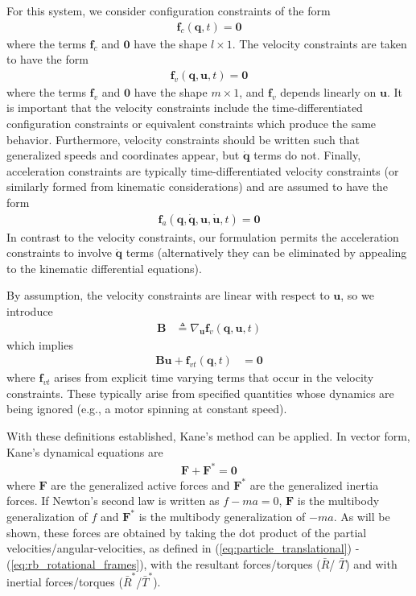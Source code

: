 \documentclass[smallcondensed,final]{svjour3}                     %
\begin{document}
For this system, we consider configuration constraints of the form
\begin{align}
\label{eq:configuration_constraints}
\mathbf{f}_c(\mathbf{q}, t) = \mathbf{0}
\end{align}
where the terms $\mathbf{f}_c$ and $\mathbf{0}$ have the shape $l \times 1$.
The velocity constraints are taken to have the form
\begin{align}
\label{eq:velocity_constraints}
\mathbf{f}_v(\mathbf{q}, \mathbf{u}, t) = \mathbf{0}
\end{align}
where the terms $\mathbf{f}_v$ and $\mathbf{0}$ have the shape $m \times 1$,
and $\mathbf{f}_v$ depends linearly on $\mathbf{u}$.  It is important that the
velocity constraints include the time-differentiated configuration constraints
or equivalent constraints which produce the same behavior. Furthermore,
velocity constraints should be written such that generalized speeds and
coordinates appear, but $\dot{\mathbf{q}}$ terms do not.  Finally, acceleration
constraints are typically time-differentiated velocity constraints (or
similarly formed from kinematic considerations) and are assumed to have the
form
\begin{align}
\label{eq:acceleration_constraints}
\mathbf{f}_a(\mathbf{q}, \dot{\mathbf{q}}, \mathbf{u}, \dot{\mathbf{u}}, t) =
\mathbf{0}
\end{align}
In contrast to the velocity constraints, our formulation permits the
acceleration constraints to involve $\dot{\mathbf{q}}$ terms (alternatively
they can be eliminated by appealing to the kinematic differential equations).

By assumption, the velocity constraints are linear with respect to
$\mathbf{u}$, so we introduce
\begin{align}
\label{eq:constraint_B}
\mathbf{B} &\triangleq \nabla_{\mathbf{u}} \mathbf{f}_v (\mathbf{q}, \mathbf{u},
t)
\end{align}
which implies
\begin{align}
\label{eq:constraint_Bu0}
\mathbf{B}\mathbf{u} + \mathbf{f}_{vt}(\mathbf{q}, t) &= \mathbf{0}
\end{align}
where $\mathbf{f}_{vt}$ arises from explicit time varying terms that occur in
the velocity constraints. These typically arise from specified quantities whose
dynamics are being ignored (e.g., a motor spinning at constant speed).

With these definitions established, Kane's method can be applied. In vector
form, Kane's dynamical equations are
\begin{align}
\label{eq:kanes_eq}
\mathbf{F} + \mathbf{F}^* = \mathbf{0}
\end{align}
where $\mathbf{F}$ are the generalized active forces and $\mathbf{F}^*$ are the
generalized inertia forces. If Newton's second law is written as $f - ma = 0$,
$\mathbf{F}$ is the multibody generalization of $f$ and $\mathbf{F}^*$ is the
multibody generalization of $-ma$. As will be shown, these forces are obtained
by taking the dot product of the partial velocities/angular-velocities, as
defined in (\ref{eq:particle_translational}) - (\ref{eq:rb_rotational_frames}),
with the resultant forces/torques ($\bar{R}$/ $\bar{T}$) and with inertial
forces/torques ($\bar{R}^*$/$\bar{T}^*$).
\end{document}
